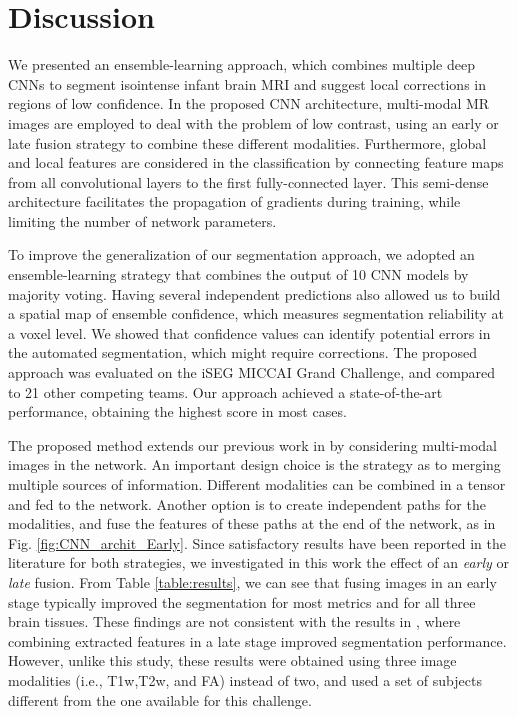 \documentclass[twoside,espcrc2]{elsarticle}
\begin{document}

\section{Discussion}\label{sec:discussion}

We presented an ensemble-learning approach, which combines multiple deep CNNs to segment isointense infant brain MRI and suggest local corrections in regions of low confidence. In the proposed CNN architecture, multi-modal MR images are employed to deal with the problem of low contrast, using an early or late fusion strategy to combine these different modalities. Furthermore, global and local features are considered in the classification by connecting feature maps from all convolutional layers to the first fully-connected layer. This semi-dense architecture facilitates the propagation of gradients during training, while limiting the number of network parameters.

To improve the generalization of our segmentation approach, we adopted an ensemble-learning strategy that combines the output of 10 CNN models by majority voting. Having several independent predictions also allowed us to build a spatial map of ensemble confidence, which measures segmentation reliability at a voxel level. We showed that confidence values can identify potential errors in the automated segmentation, which might require corrections. The proposed approach was evaluated on the iSEG MICCAI Grand Challenge, and compared to 21 other competing teams. Our approach achieved a state-of-the-art performance, obtaining the highest score in most cases.

The proposed method extends our previous work in \cite{DolzNeuro2017} by considering multi-modal images in the network. An important design choice is the strategy as to merging multiple sources of information. Different modalities can be combined in a tensor and fed to the network. Another option is to create independent paths for the modalities, and fuse the features of these paths at the end of the network, as in Fig. \ref{fig:CNN_archit_Early}. Since satisfactory results have been reported in the literature for both strategies, we investigated in this work the effect of an \textit{early} or \textit{late} fusion. From Table \ref{table:results}, we can see that fusing images in an early stage typically improved the segmentation for most metrics and for all three brain tissues. These findings are not consistent with the results in \cite{nie2016fully}, where combining extracted features in a late stage improved segmentation performance. However, unlike this study, these results were obtained using three image modalities (i.e., T1w,T2w, and FA) instead of two, and used a set of subjects different from the one available for this challenge.
\end{document}
